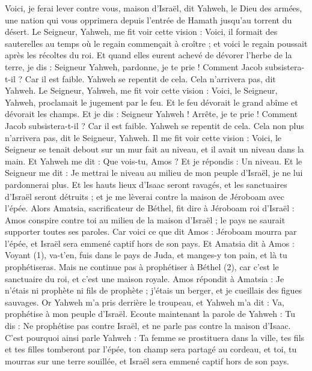 \begin{multicols}{2}
Voici, je ferai lever contre vous, maison d’Israël, dit Yahweh, le Dieu des armées, une nation qui vous opprimera depuis l'entrée de Hamath jusqu'au torrent du désert.
\VerseOne{}Le Seigneur, Yahweh, me fit voir cette vision : Voici, il formait des sauterelles au temps où le regain commençait à croître ; et voici le regain poussait après les récoltes du roi.
Et quand elles eurent achevé de dévorer l'herbe de la terre, je dis : Seigneur Yahweh, pardonne, je te prie ! Comment Jacob subsistera-t-il ? Car il est faible.
Yahweh se repentit de cela. Cela n'arrivera pas, dit Yahweh.
Le Seigneur, Yahweh, me fit voir cette vision : Voici, le Seigneur, Yahweh, proclamait le jugement par le feu. Et le feu dévorait le grand abîme et dévorait les champs.
Et je dis : Seigneur Yahweh ! Arrête, je te prie ! Comment Jacob subsistera-t-il ? Car il est faible.
Yahweh se repentit de cela. Cela non plus n'arrivera pas, dit le Seigneur, Yahweh.
Il me fit voir cette vision : Voici, le Seigneur se tenait debout sur un mur fait au niveau, et il avait un niveau dans la main.
Et Yahweh me dit : Que vois-tu, Amos ? Et je répondis : Un niveau. Et le Seigneur me dit : Je mettrai le niveau au milieu de mon peuple d'Israël, je ne lui pardonnerai plus.
Et les hauts lieux d'Isaac seront ravagés, et les sanctuaires d'Israël seront détruits ; et je me lèverai contre la maison de Jéroboam avec l'épée.
Alors Amatsia, sacrificateur de Béthel, fit dire à Jéroboam roi d'Israël : Amos conspire contre toi au milieu de la maison d'Israël ; le pays ne saurait supporter toutes ses paroles.
Car voici ce que dit Amos : Jéroboam mourra par l'épée, et Israël sera emmené captif hors de son pays.
Et Amatsia dit à Amos : Voyant (1), va-t’en, fuis dans le pays de Juda, et manges-y ton pain, et là tu prophétiseras.
Mais ne continue pas à prophétiser à Béthel (2), car c'est le sanctuaire du roi, et c'est une maison royale.
Amos répondit à Amatsia : Je n'étais ni prophète ni fils de prophète ; j'étais un berger, et je cueillais des figues sauvages.
Or Yahweh m’a pris derrière le troupeau, et Yahweh m’a dit : Va, prophétise à mon peuple d'Israël.
Ecoute maintenant la parole de Yahweh : Tu dis : Ne prophétise pas contre Israël, et ne parle pas contre la maison d'Isaac.
C'est pourquoi ainsi parle Yahweh : Ta femme se prostituera dans la ville, tes fils et tes filles tomberont par l'épée, ton champ sera partagé au cordeau, et toi, tu mourras sur une terre souillée, et Israël sera emmené captif hors de son pays.

\end{multicols}
